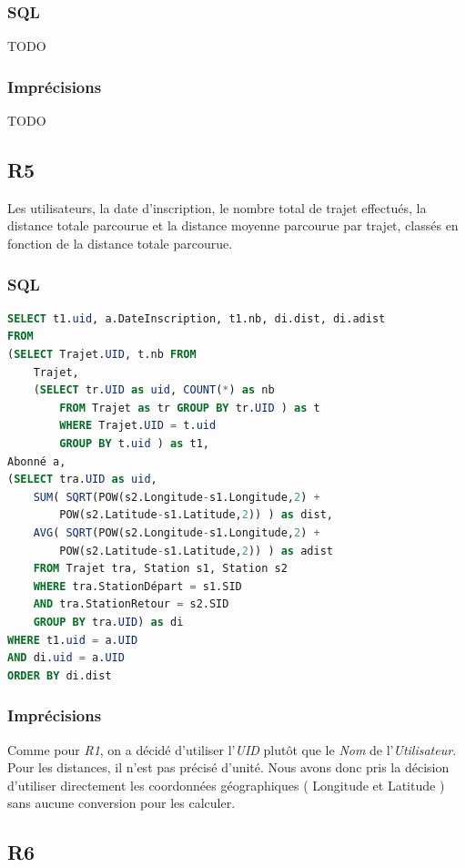 \documentclass[a4paper, 12pt]{report}
\begin{document}
\subsubsection*{SQL}
TODO%

\subsubsection*{Imprécisions}

TODO%

\subsection*{R5}

Les utilisateurs, la date d'inscription, le nombre total de trajet effectués, la distance totale parcourue et la distance moyenne parcourue par trajet, classés en fonction de la distance totale parcourue.

\subsubsection*{SQL}

\begin{lstlisting}[language=sql]
SELECT t1.uid, a.DateInscription, t1.nb, di.dist, di.adist 
FROM 
(SELECT Trajet.UID, t.nb FROM
	Trajet,
	(SELECT tr.UID as uid, COUNT(*) as nb 
		FROM Trajet as tr GROUP BY tr.UID ) as t
		WHERE Trajet.UID = t.uid
		GROUP BY t.uid ) as t1,
Abonné a,
(SELECT tra.UID as uid, 
	SUM( SQRT(POW(s2.Longitude-s1.Longitude,2) +
	 	POW(s2.Latitude-s1.Latitude,2)) ) as dist,
	AVG( SQRT(POW(s2.Longitude-s1.Longitude,2) + 
		POW(s2.Latitude-s1.Latitude,2)) ) as adist
	FROM Trajet tra, Station s1, Station s2
	WHERE tra.StationDépart = s1.SID
	AND tra.StationRetour = s2.SID
	GROUP BY tra.UID) as di
WHERE t1.uid = a.UID
AND di.uid = a.UID
ORDER BY di.dist
\end{lstlisting}

\subsubsection*{Imprécisions}

Comme pour \textit{R1}, on a décidé d'utiliser l'\textit{UID} plutôt que le \textit{Nom} de l'\textit{Utilisateur}.
Pour les distances, il n'est pas précisé d'unité. Nous avons donc pris la décision d'utiliser directement les coordonnées géographiques ( Longitude et Latitude ) sans aucune conversion pour les calculer.
\subsection*{R6}
\end{document}
